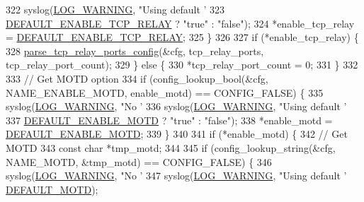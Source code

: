\begin{DoxyCode}
{{{{{{{{{{{{{{322         syslog(\hyperlink{logger_8h_aa5a9053636a30269210c54e734e0d583a8f6fe15bfe15104da6d1b360194a5400}{LOG\_WARNING}, \textcolor{stringliteral}{"Using default '%
323                \hyperlink{tox-bootstrapd_8c_acfa79b0cd7c40eb8d55462d8b8fa0e17}{DEFAULT\_ENABLE\_TCP\_RELAY} ? \textcolor{stringliteral}{"true"} : \textcolor{stringliteral}{"false"});
324         *enable\_tcp\_relay = \hyperlink{tox-bootstrapd_8c_acfa79b0cd7c40eb8d55462d8b8fa0e17}{DEFAULT\_ENABLE\_TCP\_RELAY};
325     \}
326 
327     \textcolor{keywordflow}{if} (*enable\_tcp\_relay) \{
328         \hyperlink{tox-bootstrapd_8c_a21026d73be31f649ba809b1c56cbdbe6}{parse\_tcp\_relay\_ports\_config}(&cfg, tcp\_relay\_ports, 
      tcp\_relay\_port\_count);
329     \} \textcolor{keywordflow}{else} \{
330         *tcp\_relay\_port\_count = 0;
331     \}
332 
333     \textcolor{comment}{// Get MOTD option}
334     \textcolor{keywordflow}{if} (config\_lookup\_bool(&cfg, NAME\_ENABLE\_MOTD, enable\_motd) == CONFIG\_FALSE) \{
335         syslog(\hyperlink{logger_8h_aa5a9053636a30269210c54e734e0d583a8f6fe15bfe15104da6d1b360194a5400}{LOG\_WARNING}, \textcolor{stringliteral}{"No '%
336         syslog(\hyperlink{logger_8h_aa5a9053636a30269210c54e734e0d583a8f6fe15bfe15104da6d1b360194a5400}{LOG\_WARNING}, \textcolor{stringliteral}{"Using default '%
337                \hyperlink{tox-bootstrapd_8c_a1014d7c1334195d6330fb4b7d05d210c}{DEFAULT\_ENABLE\_MOTD} ? \textcolor{stringliteral}{"true"} : \textcolor{stringliteral}{"false"});
338         *enable\_motd = \hyperlink{tox-bootstrapd_8c_a1014d7c1334195d6330fb4b7d05d210c}{DEFAULT\_ENABLE\_MOTD};
339     \}
340 
341     \textcolor{keywordflow}{if} (*enable\_motd) \{
342         \textcolor{comment}{// Get MOTD}
343         \textcolor{keyword}{const} \textcolor{keywordtype}{char} *tmp\_motd;
344 
345         \textcolor{keywordflow}{if} (config\_lookup\_string(&cfg, NAME\_MOTD, &tmp\_motd) == CONFIG\_FALSE) \{
346             syslog(\hyperlink{logger_8h_aa5a9053636a30269210c54e734e0d583a8f6fe15bfe15104da6d1b360194a5400}{LOG\_WARNING}, \textcolor{stringliteral}{"No '%
347             syslog(\hyperlink{logger_8h_aa5a9053636a30269210c54e734e0d583a8f6fe15bfe15104da6d1b360194a5400}{LOG\_WARNING}, \textcolor{stringliteral}{"Using default '%
      \hyperlink{tox-bootstrapd_8c_a91de4e54937ebc70859c64e252a85941}{DEFAULT\_MOTD});
}}}}}}}}}}}}}}}}}}}
\end{DoxyCode}
